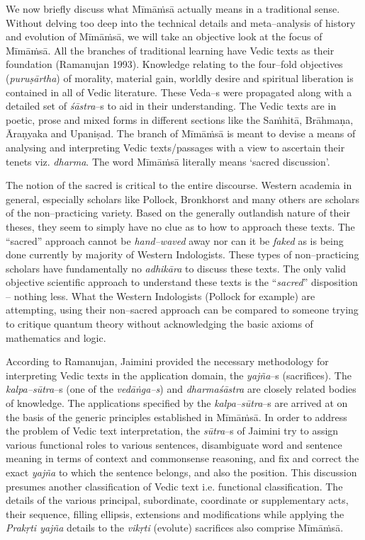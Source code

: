 We now briefly discuss what Mīmāṁsā actually means in a traditional sense. Without delving too deep into the technical details and meta–analysis of history and evolution of Mīmāṁsā, we will take an objective look at the focus of Mīmāṁsā. All the branches of traditional learning have Vedic texts as their foundation (Ramanujan 1993). Knowledge relating to the four–fold objectives (\textit{puruṣārtha}) of morality, material gain, worldly desire and spiritual liberation is contained in all of Vedic literature. These Veda–s were propagated along with a detailed set of \textit{śāstra}–s to aid in their understanding. The Vedic texts are in poetic, prose and mixed forms in different sections like the Saṁhitā, Brāhmaṇa, Āraṇyaka and Upaniṣad. The branch of Mīmāṁsā is meant to devise a means of analysing and interpreting Vedic texts/passages with a view to ascertain their tenets viz. \textit{dharma}. The word Mīmāṁsā literally means ‘sacred discussion’.

The notion of the sacred is critical to the entire discourse. Western academia in general, especially scholars like Pollock, Bronkhorst and many others are scholars of the non–practicing variety. Based on the generally outlandish nature of their theses, they seem to simply have no clue as to how to approach these texts. The ``sacred” approach cannot be \textit{hand–waved} away nor can it be \textit{faked} as is being done currently by majority of Western Indologists. These types of non–practicing scholars have fundamentally no \textit{adhikāra} to discuss these texts. The only valid objective scientific approach to understand these texts is the ``\textit{sacred}” disposition – nothing less. What the Western Indologists (Pollock for example) are attempting, using their non–sacred approach can be compared to someone trying to critique quantum theory without acknowledging the basic axioms of mathematics and logic.

According to Ramanujan, Jaimini provided the necessary methodology for interpreting Vedic texts in the application domain, the \textit{yajña}–s (sacrifices). The \textit{kalpa–sūtra}–s (one of the \textit{vedāṅga–s}) and \textit{dharmaśāstra} are closely related bodies of knowledge. The applications specified by the \textit{kalpa–sūtra}–s are arrived at on the basis of the generic principles established in Mīmāṁsā. In order to address the problem of Vedic text interpretation, the \textit{sūtra}–s of Jaimini try to assign various functional roles to various sentences, disambiguate word and sentence meaning in terms of context and commonsense reasoning, and fix and correct the exact \textit{yajña} to which the sentence belongs, and also the position. This discussion presumes another classification of Vedic text i.e. functional classification. The details of the various principal, subordinate, coordinate or supplementary acts, their sequence, filling ellipsis, extensions and modifications while applying the \textit{Prakṛti yajña} details to the \textit{vikṛti} (evolute) sacrifices also comprise Mīmāṁsā.

